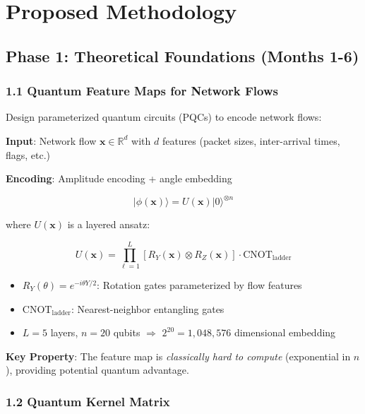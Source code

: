 \documentclass[11pt]{article}
\begin{document}
\section{Proposed Methodology}

\subsection{Phase 1: Theoretical Foundations (Months 1-6)}

\subsubsection{1.1 Quantum Feature Maps for Network Flows}

Design parameterized quantum circuits (PQCs) to encode network flows:

\textbf{Input}: Network flow $\mathbf{x} \in \mathbb{R}^{d}$ with $d$ features (packet sizes, inter-arrival times, flags, etc.)

\textbf{Encoding}: Amplitude encoding + angle embedding

\begin{equation}
|\phi(\mathbf{x})\rangle = U(\mathbf{x}) |0\rangle^{\otimes n}
\end{equation}

where $U(\mathbf{x})$ is a layered ansatz:

\begin{equation}
U(\mathbf{x}) = \prod_{\ell=1}^{L} \left[ R_Y(\mathbf{x}) \otimes R_Z(\mathbf{x}) \right] \cdot \text{CNOT}_{\text{ladder}}
\end{equation}

\begin{itemize}
    \item $R_Y(\theta) = e^{-i \theta Y/2}$: Rotation gates parameterized by flow features
    \item $\text{CNOT}_{\text{ladder}}$: Nearest-neighbor entangling gates
    \item $L = 5$ layers, $n = 20$ qubits $\Rightarrow$ $2^{20} = 1{,}048{,}576$ dimensional embedding
\end{itemize}

\textbf{Key Property}: The feature map is \textit{classically hard to compute} (exponential in $n$), providing potential quantum advantage.

\subsubsection{1.2 Quantum Kernel Matrix}
\end{document}
